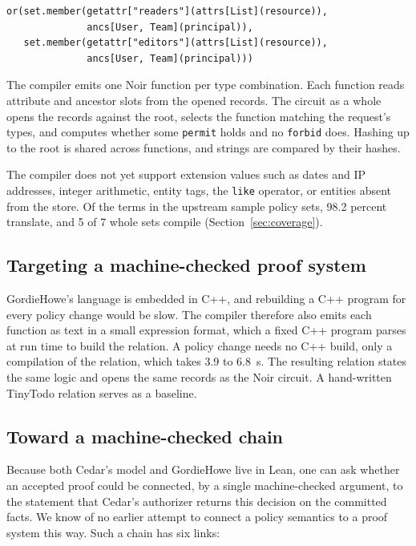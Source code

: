 \documentclass[11pt]{article}
\begin{document}
\begin{verbatim}
or(set.member(getattr["readers"](attrs[List](resource)),
              ancs[User, Team](principal)),
   set.member(getattr["editors"](attrs[List](resource)),
              ancs[User, Team](principal)))
\end{verbatim}

\noindent The compiler emits one Noir function per type combination. Each function reads attribute and ancestor slots from the opened records. The circuit as a whole opens the records against the root, selects the function matching the request's types, and computes whether some \texttt{permit} holds and no \texttt{forbid} does. Hashing up to the root is shared across functions, and strings are compared by their hashes.

The compiler does not yet support extension values such as dates and IP addresses, integer arithmetic, entity tags, the \texttt{like} operator, or entities absent from the store. Of the terms in the upstream sample policy sets, 98.2 percent translate, and 5 of 7 whole sets compile (Section~\ref{sec:coverage}).

\subsection{Targeting a machine-checked proof system}

GordieHowe's language is embedded in C++, and rebuilding a C++ program for every policy change would be slow. The compiler therefore also emits each function as text in a small expression format, which a fixed C++ program parses at run time to build the relation. A policy change needs no C++ build, only a compilation of the relation, which takes 3.9 to 6.8~s. The resulting relation states the same logic and opens the same records as the Noir circuit. A hand-written TinyTodo relation serves as a baseline.

\subsection{Toward a machine-checked chain}
\label{sec:lean}

Because both Cedar's model and GordieHowe live in Lean, one can ask whether an accepted proof could be connected, by a single machine-checked argument, to the statement that Cedar's authorizer returns this decision on the committed facts. We know of no earlier attempt to connect a policy semantics to a proof system this way. Such a chain has six links:
\end{document}
